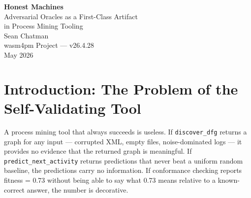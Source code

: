 \documentclass[12pt,a4paper]{article}
\begin{document}
\begin{titlepage}
  \centering
  \vspace*{3cm}
  {\LARGE\bfseries Honest Machines}\\[0.5em]
  {\Large Adversarial Oracles as a First-Class Artifact\\in Process Mining Tooling}\\[2em]
  {\large Sean Chatman}\\[0.5em]
  {\normalsize wasm4pm Project — v26.4.28}\\[0.5em]
  {\normalsize May 2026}\\[3em]

  \begin{abstract}
    \noindent
    Process mining tools have long validated themselves against their own outputs.
    A discovery algorithm is declared correct when it produces a plausible-looking
    Petri net; a conformance checker is declared working when it returns a number
    between zero and one. This paper argues that such self-referential validation
    is epistemically bankrupt. Drawing on the Van der Aalst constitution ---
    \emph{if the code says it worked but the event log cannot prove a lawful
    process happened, then it did not work} --- and on adversarial testing patterns
    extracted from three independent codebases (dteam, unibit, bcinr), we present
    a systematic methodology for building process mining tools that can be
    falsified. We instantiate this methodology in \texttt{wasm4pm}, a Rust/WASM
    process mining platform, producing 65 new tests organized by oracle rank,
    covering streaming equivalence, ground-truth corpus validation, gate
    rejection, prediction anti-leakage, OCEL many-to-many semantics, and
    enterprise dirty data impact. The central contribution is not the tests
    themselves but the epistemological position they enforce: \textbf{a tool that
    cannot document its own failure modes is not a scientific instrument.}
  \end{abstract}
\end{titlepage}

\tableofcontents
\newpage

\section{Introduction: The Problem of the Self-Validating Tool}
\label{sec:intro}

A process mining tool that always succeeds is useless. If \texttt{discover\_dfg}
returns a graph for any input --- corrupted XML, empty files, noise-dominated
logs --- it provides no evidence that the returned graph is meaningful. If
\texttt{predict\_next\_activity} returns predictions that never beat a uniform
random baseline, the predictions carry no information. If conformance checking
reports fitness = 0.73 without being able to say what 0.73 means relative to a
known-correct answer, the number is decorative.
\end{document}
